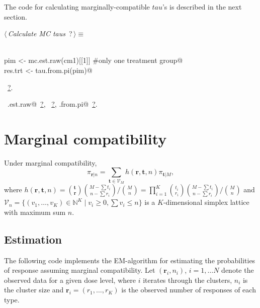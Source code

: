 \documentclass[reqno]{amsart}
\renewcommand{\NWtarget}[2]{\hypertarget{#1}{#2}}
\renewcommand{\NWlink}[2]{\hyperlink{#1}{#2}}
\newcommand{\rvec}{\mathbf{r}}
\newcommand{\tvec}{\mathbf{t}}
\newcommand{\V}{\mathcal{V}}
\begin{document}
The code for calculating marginally-compatible $tau$'s is described in the next section.

\begin{flushleft} \small\label{scrap18}\raggedright\small
\NWtarget{nuweb?}{} $\langle\,${\itshape Calculate MC taus}\nobreak\ {\footnotesize {?}}$\,\rangle\equiv$
\vspace{-1ex}
\begin{list}{}{} \item
\mbox{}\verb@@\\
\mbox{}\verb@   pim <- mc.est.raw(cm1)[[1]]  #only one treatment group@\\
\mbox{}\verb@   res.trt <- tau.from.pi(pim)@\\
\mbox{}\verb@@{\NWsep}
\end{list}
\vspace{-1.5ex}
\footnotesize
\begin{list}{}{\setlength{\itemsep}{-\parsep}\setlength{\itemindent}{-\leftmargin}}
\item \NWtxtMacroRefIn\ \NWlink{nuweb?}{?}.
\item \NWtxtIdentsUsed\nobreak\  \verb@mc.est.raw@\nobreak\ \NWlink{nuweb?}{?}, \verb@tau@\nobreak\ \NWlink{nuweb?}{?}, \verb@tau.from.pi@\nobreak\ \NWlink{nuweb?}{?}.
\item{}
\end{list}
\vspace{4ex}
\end{flushleft}
\section{Marginal compatibility}

Under marginal compatibility,
\begin{equation}
\pi_{\rvec|n} = \sum_{\tvec \in \V_M} h(\rvec, \tvec, n) \pi_{\tvec|M},
\end{equation}
where $h(\rvec, \tvec, n)  = \binom{\tvec}{\rvec}\binom{M-\sum t_i}{n-\sum r_i} \big/ \binom{M}{n} = 
\prod_{i=1}^K \binom{t_i}{r_i}\binom{M-\sum t_i}{n-\sum r_i} \big/ \binom{M}{n}$ and
$\V_n=\{(v_1,\ldots,v_K)\in \mathbb{N}^K \mid v_i \geq 0, \sum v_i \leq n\}$ is a $K$-dimensional simplex lattice with maximum
sum $n$.

\subsection{Estimation}

The following code implements the EM-algorithm for estimating the probabilities
of response assuming marginal compatibility. Let $(\rvec_i, n_i)$, $i=1,\ldots N$ denote
the observed data for a given dose level, where $i$ iterates
through the clusters, $n_i$ is the cluster size and 
$\rvec_i = (r_1,\ldots,r_K)$ is the observed number of responses of each type.
\end{document}

